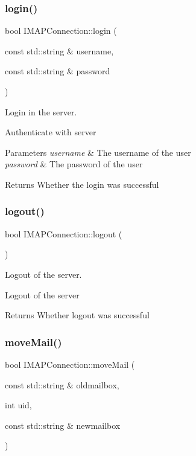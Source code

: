 \subsubsection{\texorpdfstring{login()}{login()}}
{\footnotesize\ttfamily bool I\+M\+A\+P\+Connection\+::login (\begin{DoxyParamCaption}\item[{const std\+::string \&}]{username,  }\item[{const std\+::string \&}]{password }\end{DoxyParamCaption})}



Login in the server. 

Authenticate with server


\begin{DoxyParams}{Parameters}
{\em username} & The username of the user \\
\hline
{\em password} & The password of the user\\
\hline
\end{DoxyParams}
\begin{DoxyReturn}{Returns}
Whether the login was successful 
\end{DoxyReturn}
\mbox{\label{classIMAPConnection_a250af5ae627fcdc73f3322237fe537f4}} 
\subsubsection{\texorpdfstring{logout()}{logout()}}
{\footnotesize\ttfamily bool I\+M\+A\+P\+Connection\+::logout (\begin{DoxyParamCaption}{ }\end{DoxyParamCaption})}



Logout of the server. 

Logout of the server \begin{DoxyReturn}{Returns}
Whether logout was successful 
\end{DoxyReturn}
\mbox{\label{classIMAPConnection_a852132e646dcc4e658cc26135f452831}} 
\subsubsection{\texorpdfstring{move\+Mail()}{moveMail()}}
{\footnotesize\ttfamily bool I\+M\+A\+P\+Connection\+::move\+Mail (\begin{DoxyParamCaption}\item[{const std\+::string \&}]{oldmailbox,  }\item[{int}]{uid,  }\item[{const std\+::string \&}]{newmailbox }\end{DoxyParamCaption})}



